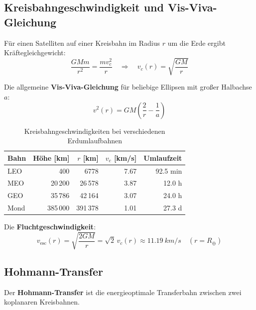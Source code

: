 ﻿\documentclass[12pt,a4paper]{article}
\begin{document}
\subsection{Kreisbahngeschwindigkeit und Vis-Viva-Gleichung}

Für einen Satelliten auf einer Kreisbahn im Radius $r$ um die Erde ergibt
Kräftegleichgewicht:
\[
  \frac{GMm}{r^2} = \frac{mv_c^2}{r}
  \quad\Rightarrow\quad
  v_c(r) = \sqrt{\frac{GM}{r}}
\]

Die allgemeine \textbf{Vis-Viva-Gleichung} für beliebige Ellipsen mit großer Halbachse $a$:
\[
  \boxed{v^2(r) = GM\left(\frac{2}{r} - \frac{1}{a}\right)}
\]

\begin{table}[H]
\centering
\caption{Kreisbahngeschwindigkeiten bei verschiedenen Erdumlaufbahnen}
\label{tab:bahnen}
\begin{tabular}{lrrrr}
\toprule
\textbf{Bahn} & \textbf{Höhe [km]} & \textbf{$r$ [km]} & \textbf{$v_c$ [km/s]} & \textbf{Umlaufzeit}\\
\midrule
LEO      & 400    & 6778   & 7.67 & 92.5 min\\
MEO      & 20\,200 & 26\,578 & 3.87 & 12.0 h\\
GEO      & 35\,786 & 42\,164 & 3.07 & 24.0 h\\
Mond     & 385\,000 & 391\,378 & 1.01 & 27.3 d\\
\bottomrule
\end{tabular}
\end{table}

Die \textbf{Fluchtgeschwindigkeit}:
\[
  v_{\mathrm{esc}}(r) = \sqrt{\frac{2GM}{r}} = \sqrt{2}\,v_c(r)
  \approx \SI{11.19}{km/s} \quad (r = R_\oplus)
\]

\subsection{Hohmann-Transfer}

Der \textbf{Hohmann-Transfer} ist die energieoptimale Transferbahn zwischen zwei
koplanaren Kreisbahnen.
\end{document}
